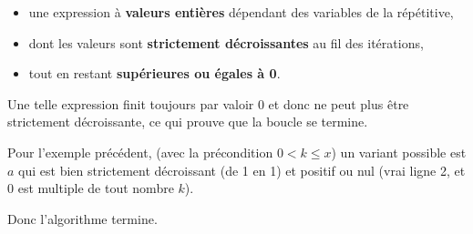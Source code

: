 \begin{itemize}
	\item une expression à {\bfseries valeurs entières} dépendant des variables de la répétitive,
	\item dont les valeurs sont {\bfseries strictement décroissantes} au fil des itérations,
	\item tout en restant {\bfseries supérieures ou égales à 0}.
\end{itemize}

Une telle expression finit toujours par valoir 0 et donc ne peut plus être strictement décroissante, ce qui prouve que la boucle se termine.

Pour l'exemple précédent, (avec la précondition $0<k\leqslant x$) un variant possible est $a$ qui est bien strictement décroissant (de 1 en 1) et positif ou nul (vrai ligne 2, et 0 est multiple de tout nombre $k$).

Donc l'algorithme termine.

